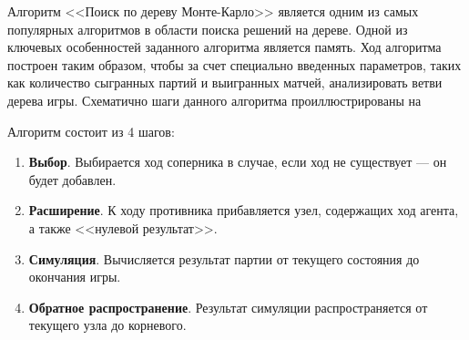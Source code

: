 Алгоритм <<Поиск по дереву Монте-Карло>> является одним из самых популярных алгоритмов в области поиска решений на дереве. Одной из ключевых особенностей заданного алгоритма является память. Ход алгоритма построен таким образом, чтобы за счет специально введенных параметров, таких как количество сыгранных партий и выигранных матчей, анализировать ветви дерева игры. Схематично шаги данного алгоритма проиллюстрированы на 

Алгоритм состоит из 4 шагов:
\begin{enumerate}
    \item \textbf{Выбор}. Выбирается ход соперника в случае, если ход не существует --- он будет добавлен.
    \item \textbf{Расширение}. К ходу противника прибавляется узел, содержащих ход агента, а также <<нулевой результат>>.
    \item \textbf{Симуляция}. Вычисляется результат партии от текущего состояния до окончания игры.
    \item \textbf{Обратное распространение}. Результат симуляции распространяется от текущего узла до корневого.
\end{enumerate}

